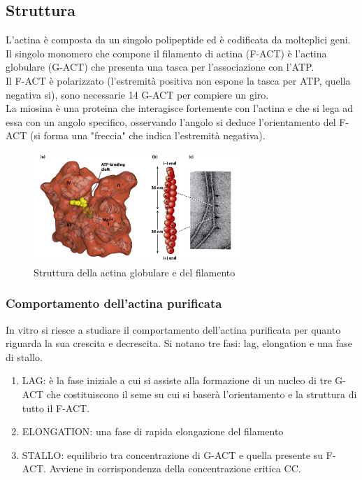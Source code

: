     \subsection{Struttura}
        L'actina è composta da un singolo polipeptide ed è codificata da molteplici geni. Il singolo monomero che compone il filamento di actina (F-ACT) è l'actina globulare (G-ACT) che presenta una tasca per l'associazione con l'ATP.\\
        Il F-ACT è polarizzato (l'estremità positiva non espone la tasca per ATP, quella negativa si), sono necessarie 14 G-ACT per compiere un giro.\\
        La miosina è una proteina che interagisce fortemente con l'actina e che si lega ad essa con un angolo specifico, osservando l'angolo si deduce l'orientamento del F-ACT (si forma una "freccia" che indica l'estremità negativa).
        \begin{figure}[h]
            \centering
            \includegraphics[width=0.7\textwidth]{images/G-ACTeF-ACT.JPG}
            \caption{\small Struttura della actina globulare e del filamento}
            \label{fig:mesh1}
        \end{figure}
        
        \subsubsection{Comportamento dell'actina purificata}
            In vitro si riesce a studiare il comportamento dell'actina purificata per quanto riguarda la sua crescita e decrescita. Si notano tre fasi: lag, elongation e una fase di stallo.
            \begin{enumerate}
                \item LAG: è la fase iniziale a cui si assiste alla formazione di un nucleo di tre G-ACT che costituiscono il seme su cui si baserà l'orientamento e la struttura di tutto il F-ACT.
                \item ELONGATION: una fase di rapida elongazione del filamento
                \item STALLO: equilibrio tra concentrazione di G-ACT e quella presente su F-ACT. Avviene in corrispondenza della concentrazione critica CC.
            \end{enumerate}
            

